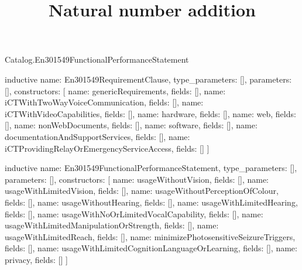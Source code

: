 \begin{lexlean}{Catalog.En301549FunctionalPerformanceStatement}
\title{Natural number addition}
\begin{semanticmodule}
inductive{
  name: En301549RequirementClause,
  type_parameters: [],
  parameters: [],
  constructors: [
    {name: genericRequirements, fields: []},
    {name: iCTWithTwoWayVoiceCommunication, fields: []},
    {name: iCTWithVideoCapabilities, fields: []},
    {name: hardware, fields: []},
    {name: web, fields: []},
    {name: nonWebDocuments, fields: []},
    {name: software, fields: []},
    {name: documentationAndSupportServices, fields: []},
    {name: iCTProvidingRelayOrEmergencyServiceAccess, fields: []}
  ]
}

inductive{
  name: En301549FunctionalPerformanceStatement,
  type_parameters: [],
  parameters: [],
  constructors: [
    {name: usageWithoutVision, fields: []},
    {name: usageWithLimitedVision, fields: []},
    {name: usageWithoutPerceptionOfColour, fields: []},
    {name: usageWithoutHearing, fields: []},
    {name: usageWithLimitedHearing, fields: []},
    {name: usageWithNoOrLimitedVocalCapability, fields: []},
    {name: usageWithLimitedManipulationOrStrength, fields: []},
    {name: usageWithLimitedReach, fields: []},
    {name: minimizePhotosensitiveSeizureTriggers, fields: []},
    {name: usageWithLimitedCognitionLanguageOrLearning, fields: []},
    {name: privacy, fields: []}
  ]
}
\end{semanticmodule}
\end{lexlean}
